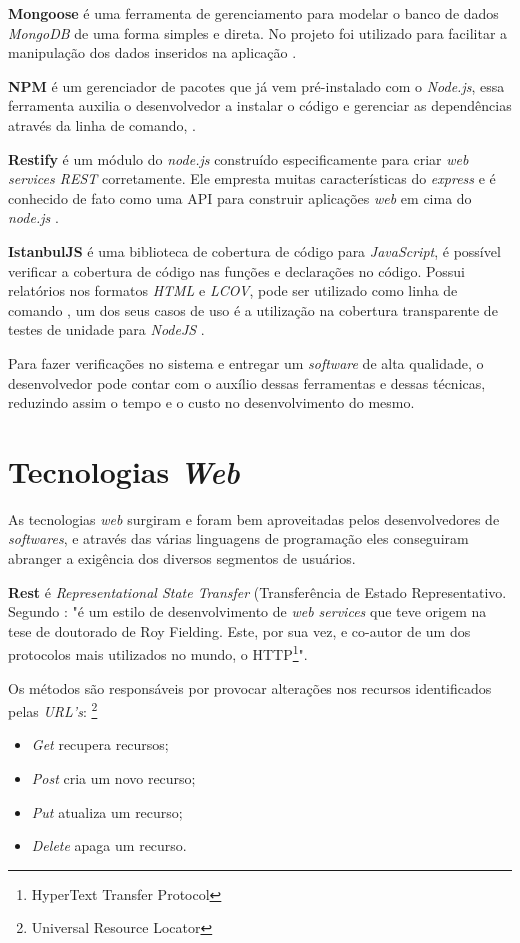 \textbf{Mongoose} é uma ferramenta de gerenciamento para modelar o banco de dados \textit{MongoDB} de uma forma simples e direta. No projeto foi utilizado para facilitar a manipulação dos dados inseridos na aplicação \cite{Mongoose}.

\textbf{NPM} é um gerenciador de pacotes que já vem pré-instalado com o \textit{Node.js}, essa ferramenta auxilia o desenvolvedor a instalar o código e gerenciar as dependências através da linha de comando, \cite{NPM}.

\textbf{Restify} é um módulo do \textit{node.js} construído especificamente para criar\textit{ web services REST} corretamente. Ele empresta muitas características do \textit{express} e é conhecido de fato como uma API para construir aplicações \textit{web} em cima do \textit{node.js} \cite{restify}.

\textbf{IstanbulJS} é uma biblioteca de cobertura de código para \textit{JavaScript}, é possível verificar a cobertura de código nas funções e declarações no código. Possui relatórios nos formatos \textit{HTML} e \textit{LCOV}, pode ser utilizado como linha de comando , um dos seus casos de uso é a utilização na cobertura transparente de testes de unidade para \textit{NodeJS} \cite{istanbul}.

\par Para fazer verificações no sistema e entregar um \textit{software} de alta qualidade, o desenvolvedor pode contar com o auxílio dessas ferramentas e dessas técnicas, reduzindo assim o tempo e o custo no desenvolvimento do mesmo.
     

\section{Tecnologias \textit{Web}}
\par As tecnologias \textit{web} surgiram e foram bem aproveitadas pelos desenvolvedores de \textit{softwares}, e através das várias linguagens de programação eles conseguiram abranger a exigência dos diversos segmentos de usuários.

\textbf{Rest} é \textit{Representational State Transfer} (Transferência de Estado Representativo. Segundo : "é um estilo de desenvolvimento de \textit{web services} que teve origem na tese de doutorado de Roy Fielding. Este, por sua vez, e co-autor de um dos protocolos mais utilizados no mundo, o HTTP\footnote{HyperText Transfer Protocol}".
 
\par Os métodos são responsáveis por provocar alterações nos recursos identificados pelas \textit{URL's}: \footnote{Universal Resource Locator}
\begin{itemize}
    \item \textit{Get} recupera recursos;
    \item \textit{Post} cria um novo recurso;
    \item \textit{Put} atualiza um recurso;
    \item \textit{Delete} apaga um recurso.
\end{itemize}


